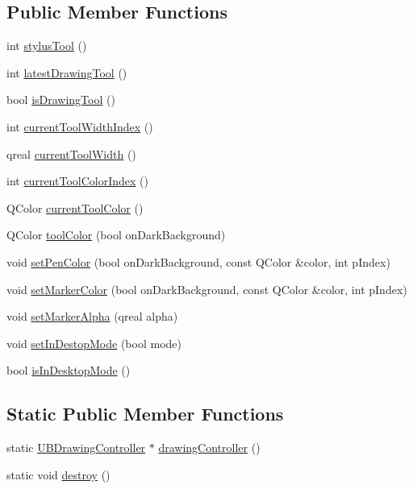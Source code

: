 \subsection*{Public Member Functions}
\begin{DoxyCompactItemize}
\item 
int \hyperlink{class_u_b_drawing_controller_a244d6a9a4638309428bcf0c29531b872}{stylus\-Tool} ()
\item 
int \hyperlink{class_u_b_drawing_controller_a38e9144276adfeee7177dc63f9984970}{latest\-Drawing\-Tool} ()
\item 
bool \hyperlink{class_u_b_drawing_controller_a524a00e4ea813998e0e99ecf9e20e193}{is\-Drawing\-Tool} ()
\item 
int \hyperlink{class_u_b_drawing_controller_a1e50d02c857b27ea14a59c6d74536376}{current\-Tool\-Width\-Index} ()
\item 
qreal \hyperlink{class_u_b_drawing_controller_a0fe4771ef68a84bc65b3adeaba2f407f}{current\-Tool\-Width} ()
\item 
int \hyperlink{class_u_b_drawing_controller_a66e70ba97bee8b5135e234b17140064b}{current\-Tool\-Color\-Index} ()
\item 
Q\-Color \hyperlink{class_u_b_drawing_controller_abf7c58880089c0cced9c2b91ff98314c}{current\-Tool\-Color} ()
\item 
Q\-Color \hyperlink{class_u_b_drawing_controller_afae64ee4b072bcc20b5234eec4dc5f56}{tool\-Color} (bool on\-Dark\-Background)
\item 
void \hyperlink{class_u_b_drawing_controller_a38ac047c19769a9de1b7ddd9296e4cf9}{set\-Pen\-Color} (bool on\-Dark\-Background, const Q\-Color \&color, int p\-Index)
\item 
void \hyperlink{class_u_b_drawing_controller_a5596efb2d521ca9ca45facf3be65f13f}{set\-Marker\-Color} (bool on\-Dark\-Background, const Q\-Color \&color, int p\-Index)
\item 
void \hyperlink{class_u_b_drawing_controller_ab3a253ed3b05d693330fc1cd5f752d20}{set\-Marker\-Alpha} (qreal alpha)
\item 
void \hyperlink{class_u_b_drawing_controller_a3e260cf4d46a9fbefadb3fcd5b68f214}{set\-In\-Destop\-Mode} (bool mode)
\item 
bool \hyperlink{class_u_b_drawing_controller_ae78d73edf7b585f742229d5766f83efc}{is\-In\-Desktop\-Mode} ()
\end{DoxyCompactItemize}
\subsection*{Static Public Member Functions}
\begin{DoxyCompactItemize}
\item 
static \hyperlink{class_u_b_drawing_controller}{U\-B\-Drawing\-Controller} $\ast$ \hyperlink{class_u_b_drawing_controller_a9d2d10417806a2d7303df24b820f2ab3}{drawing\-Controller} ()
\item 
static void \hyperlink{class_u_b_drawing_controller_ac05daba2d9c39c5bacdd7e63b6e1ab39}{destroy} ()
\end{DoxyCompactItemize}
